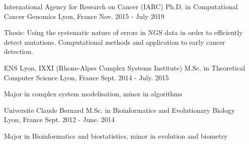 

\begin{cventries}

      \cventry
    {International Agency for Research on Cancer (IARC)} %
    {Ph.D. in Computational Cancer Genomics} %
    {Lyon, France} %
    {Nov. 2015 - July 2019} %
    {
      \begin{cvitems} %
        \item {Thesis: Using the systematic nature of errors in NGS data in order to efficiently detect mutations. Computational methods and application to early cancer detection.}
      \end{cvitems}
    }
    
      \cventry
    {ENS Lyon, IXXI (Rhone-Alpes Complex Systems Institute) } %
    {M.Sc. in Theoretical Computer Science} %
    {Lyon, France} %
    {Sept. 2014 - July. 2015} %
    {
      \begin{cvitems} %
        \item {Major in complex system modelisation, minor in algorithms}
      \end{cvitems}
    }
    
    \cventry
    {Universite Claude Bernard } %
    {M.Sc. in Bioinformatics and Evolutionary Biology} %
    {Lyon, France} %
    {Sept. 2012 - June. 2014} %
    {
      \begin{cvitems} %
        \item {Major in Bioinformatics and biostatistics, minor in evolution and biometry}
      \end{cvitems}
    }

\end{cventries}
